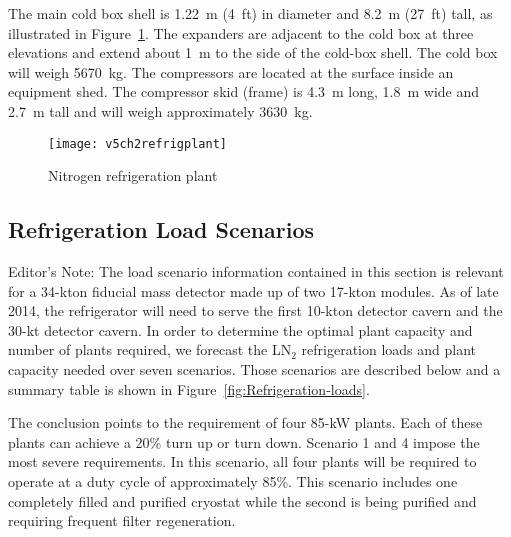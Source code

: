 The main cold box shell is 1.22~m (4~ft) in diameter and 8.2~m (27~ft) tall, as illustrated in
Figure~\ref{fig:nitrogren-refrigerator}.  The expanders are adjacent to the cold box at three elevations and extend about 1~m to the side of the cold-box shell.  The cold box will weigh 5670~kg. The compressors are located at the surface inside an equipment shed. The compressor skid (frame) is 4.3~m long, 1.8~m wide and 2.7~m tall and will weigh approximately 3630~kg.  

\begin{figure}[htbp]
\centering
\texttt{[image: v5ch2refrigplant]}
\caption{Nitrogen refrigeration plant}
\label{fig:nitrogren-refrigerator}
\end{figure}

\subsection{Refrigeration Load Scenarios}

\notestart
Editor's Note:  The load scenario information contained in this section is relevant for a 34-kton fiducial mass detector made up of two 17-kton modules.  As of late 2014, the refrigerator will need to serve the first 10-kton detector cavern and the 30-kt detector cavern.
\notestop
In order to determine the optimal plant capacity and number of plants required, we forecast the LN$_2$ refrigeration loads and plant capacity needed over seven scenarios.  Those scenarios are described below and a summary table is shown in Figure~\ref{fig:Refrigeration-loads}. 

The conclusion points to the requirement of four 85-kW plants.  Each of these plants can achieve a 20\% turn up or turn down.  Scenario 1 and 4 impose the most severe requirements. In this scenario, all four plants will be required to operate at a duty cycle of approximately 85\%. This scenario includes one completely filled and purified cryostat while the second is being purified and requiring frequent filter regeneration.

